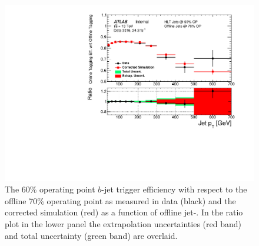 \begin{figure}[!ht]
\begin{center}
\end{center}
\vspace{-0.8em}
\caption[A figure to demonstrate the stages of the high-\pT~extrapolation procedure for the $b$-jet trigger efficiency measurement.]
        {A figure to demonstrate the stages of the high-\pT~extrapolation procedure for the 60\% operating point $b$-jet trigger efficiency with respect to the offline 70\% operating point.
          The $b$-jet trigger efficiency as a function of jet-\pT{} is shown for data (black) and simulation after corrections have been applied (red);
          the corrections used are labelled and are described in the text.
          Panel (a) shows the normalisation fit,
          panel (b) shows the linear correction fit,
          panel (c) shows linear correction uncertainties (blue lines) and
          panel (d) shows the quadratic fit.
        }
        \label{fig:bTrig_mcExtrap}
\begin{center}
    \includegraphics[width=0.57\linewidth, angle=0]{figs/Trigger/fullSys_EfficiencyComp_jetPt.pdf}
  \end{center}
\vspace{-1.2em}
\caption[The $b$-jet trigger efficiency measured in data and the corrected simulation as a function of offline jet-\pT.
  The extrapolation uncertainties and total uncertainty are shown.
    \label{fig:bTrig_jetSys_effComp}]
        {
    The 60\% operating point $b$-jet trigger efficiency with respect to the offline 70\% operating point
    as measured in data (black) and the corrected simulation (red) as a function of offline jet-\pT.
    In the ratio plot in the lower panel the extrapolation uncertainties (red band) and total uncertainty (green band) are overlaid.
    \label{fig:bTrig_jetSys_effComp}
  }
\end{figure}

